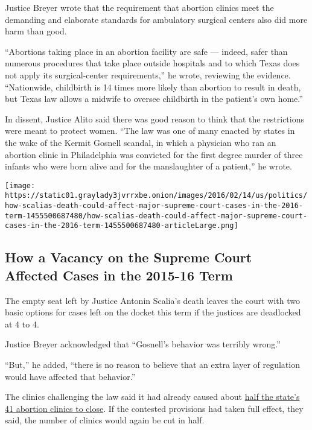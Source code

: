 Justice Breyer wrote that the requirement that abortion clinics meet the
demanding and elaborate standards for ambulatory surgical centers also
did more harm than good.

``Abortions taking place in an abortion facility are safe --- indeed,
safer than numerous procedures that take place outside hospitals and to
which Texas does not apply its surgical-center requirements,'' he wrote,
reviewing the evidence. ``Nationwide, childbirth is 14 times more likely
than abortion to result in death, but Texas law allows a midwife to
oversee childbirth in the patient's own home.''

In dissent, Justice Alito said there was good reason to think that the
restrictions were meant to protect women. ``The law was one of many
enacted by states in the wake of the Kermit Gosnell scandal, in which a
physician who ran an abortion clinic in Philadelphia was convicted for
the first degree murder of three infants who were born alive and for the
manslaughter of a patient,'' he wrote.

\href{https://www.nytimes3xbfgragh.onion/interactive/2016/02/14/us/politics/how-scalias-death-could-affect-major-supreme-court-cases-in-the-2016-term.html}{}

\texttt{[image: https://static01.graylady3jvrrxbe.onion/images/2016/02/14/us/politics/how-scalias-death-could-affect-major-supreme-court-cases-in-the-2016-term-1455500687480/how-scalias-death-could-affect-major-supreme-court-cases-in-the-2016-term-1455500687480-articleLarge.png]}

\hypertarget{how-a-vacancy-on-the-supreme-court-affected-cases-in-the-2015-16-term}{%
\subsection{How a Vacancy on the Supreme Court Affected Cases in the
2015-16
Term}\label{how-a-vacancy-on-the-supreme-court-affected-cases-in-the-2015-16-term}}

The empty seat left by Justice Antonin Scalia's death leaves the court
with two basic options for cases left on the docket this term if the
justices are deadlocked at 4 to 4.

Justice Breyer acknowledged that ``Gosnell's behavior was terribly
wrong.''

``But,'' he added, ``there is no reason to believe that an extra layer
of regulation would have affected that behavior.''

The clinics challenging the law said it had already caused about
\href{http://www.nytimes3xbfgragh.onion/interactive/2014/08/04/us/shrinking-number-of-abortion-clinics-in-texas.html}{half
the state's 41 abortion clinics to close}. If the contested provisions
had taken full effect, they said, the number of clinics would again be
cut in half.

